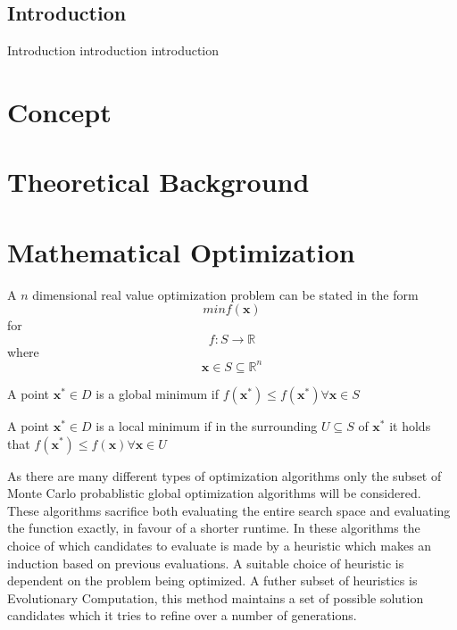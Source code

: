\documentclass[a4paper,titlepage]{report}
\begin{document}
\section*{Introduction}
Introduction introduction introduction

\tableofcontents

\chapter{Concept}


\chapter{Theoretical Background}

\chapter{Mathematical Optimization}

A $n$ dimensional real value optimization problem can be stated in the form
\[ min f(\mathbf{x})  \]
for
\[ f: S \rightarrow  \mathbb{R} \]
where
\[ \mathbf{x} \in S  \subseteq \mathbb{R}^n \]

\noindent
A point $\mathbf{x}^* \in D$ is a global minimum if  $ f(\mathbf{x}^*) \leq f(\mathbf{x}^*)  \forall  \mathbf{x} \in S$

\noindent
A point $\mathbf{x}^* \in D$ is a local minimum if  in the surrounding  $ U \subseteq S$ of  $\mathbf{x}^*$ it holds that $f(\mathbf{x}^*)  \leq f(\mathbf{x})  \forall  \mathbf{x} \in U$

As there are many different types of optimization algorithms only the subset of Monte Carlo probablistic global optimization algorithms will be considered. These algorithms sacrifice both evaluating the entire search space and evaluating the function exactly, in favour of a shorter runtime. In these algorithms the choice of which candidates to evaluate is made by a heuristic which makes an induction based on previous evaluations. A suitable choice of heuristic is dependent on the problem being optimized.  A futher subset of heuristics is Evolutionary Computation, this method maintains a set of possible solution candidates which it tries to refine over a number of generations.
\end{document}
